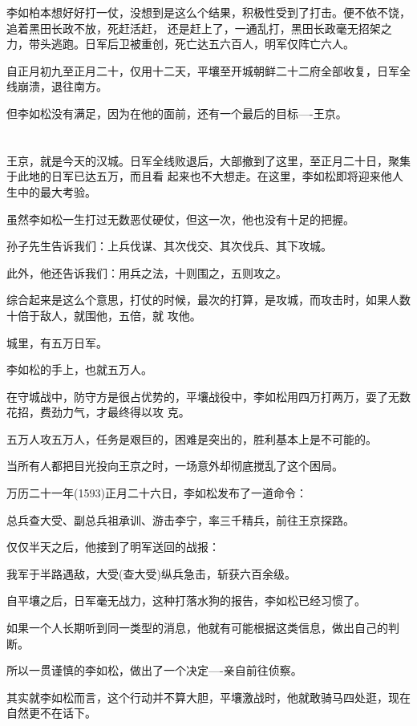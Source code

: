 \documentclass[11pt,a4paper,onecolumn]{article}
\begin{document}
李如柏本想好好打一仗，没想到是这么个结果，积极性受到了打击。便不依不饶，追着黑田长政不放，死赶活赶，
还是赶上了，一通乱打，黑田长政毫无招架之力，带头逃跑。日军后卫被重创，死亡达五六百人，明军仅阵亡六人。

自正月初九至正月二十，仅用十二天，平壤至开城朝鲜二十二府全部收复，日军全线崩溃，退往南方。

但李如松没有满足，因为在他的面前，还有一个最后的目标----王京。

\section[\thesection]{}

王京，就是今天的汉城。日军全线败退后，大部撤到了这里，至正月二十日，聚集于此地的日军已达五万，而且看
起来也不大想走。在这里，李如松即将迎来他人生中的最大考验。

虽然李如松一生打过无数恶仗硬仗，但这一次，他也没有十足的把握。

孙子先生告诉我们：上兵伐谋、其次伐交、其次伐兵、其下攻城。

此外，他还告诉我们：用兵之法，十则围之，五则攻之。

综合起来是这么个意思，打仗的时候，最次的打算，是攻城，而攻击时，如果人数十倍于敌人，就围他，五倍，就
攻他。

城里，有五万日军。

李如松的手上，也就五万人。

在守城战中，防守方是很占优势的，平壤战役中，李如松用四万打两万，耍了无数花招，费劲力气，才最终得以攻
克。

五万人攻五万人，任务是艰巨的，困难是突出的，胜利基本上是不可能的。

当所有人都把目光投向王京之时，一场意外却彻底搅乱了这个困局。

万历二十一年(1593)正月二十六日，李如松发布了一道命令：

总兵查大受、副总兵祖承训、游击李宁，率三千精兵，前往王京探路。

仅仅半天之后，他接到了明军送回的战报：

我军于半路遇敌，大受(查大受)纵兵急击，斩获六百余级。

自平壤之后，日军毫无战力，这种打落水狗的报告，李如松已经习惯了。

如果一个人长期听到同一类型的消息，他就有可能根据这类信息，做出自己的判断。

所以一贯谨慎的李如松，做出了一个决定----亲自前往侦察。

其实就李如松而言，这个行动并不算大胆，平壤激战时，他就敢骑马四处逛，现在自然更不在话下。
\end{document}
